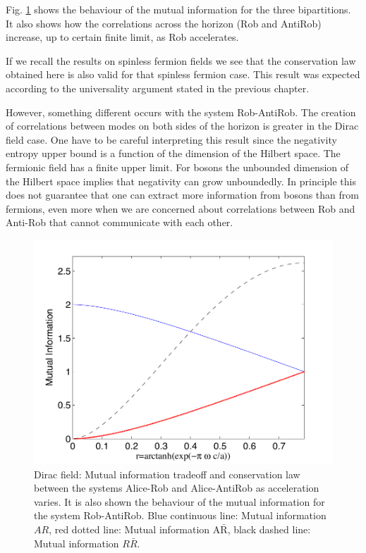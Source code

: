 Fig. \ref{mutuferm} shows the behaviour of the mutual information for the three bipartitions. It also shows how the correlations across the horizon (Rob and AntiRob) increase, up to certain finite limit, as Rob accelerates. 

If we recall the results on spinless fermion fields \cite{AlsingSchul} we see that the conservation law obtained here is also valid for that spinless fermion case. This result was expected according to the universality argument stated  in the previous chapter.

However, something different occurs with the system Rob-AntiRob. The creation of correlations between modes on both sides of the horizon is greater in the Dirac field case. One have to be careful interpreting this result since the negativity entropy upper bound is a function of the dimension of the Hilbert space. The  fermionic field has a finite upper limit. For bosons the unbounded dimension of the Hilbert space implies that negativity can grow unboundedly. In principle this does not guarantee that one can extract more information from bosons than from fermions, even more when we are concerned about correlations between Rob and Anti-Rob that cannot communicate with each other.
\begin{figure}[h]
\begin{center}
\includegraphics[width=.85\textwidth]{mutuferm}
\end{center}
\caption{ Dirac field: Mutual information tradeoff and conservation law between the systems Alice-Rob and Alice-AntiRob as acceleration varies. It is also shown the behaviour of the mutual information for the system Rob-AntiRob. Blue continuous line: Mutual information $AR$, red dotted line: Mutual information $\text{A}{\bar{\text{R}}}$, black dashed line: Mutual information $R\bar R$.}
\label{mutuferm}
\end{figure}

